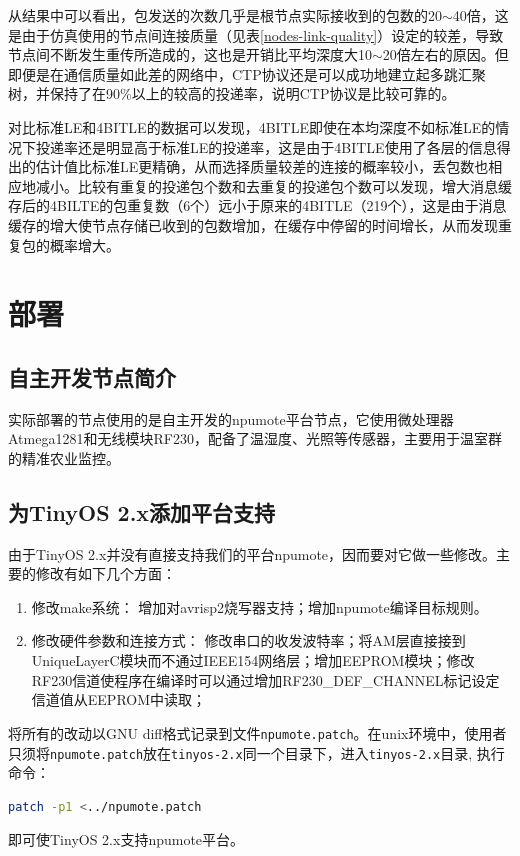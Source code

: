 从结果中可以看出，包发送的次数几乎是根节点实际接收到的包数的20$\sim$40倍，这是由于仿真使用的节点间连接质量（见表\ref{nodes-link-quality}）设定的较差，导致节点间不断发生重传所造成的，这也是开销比平均深度大10$\sim$20倍左右的原因。但即便是在通信质量如此差的网络中，CTP协议还是可以成功地建立起多跳汇聚树，并保持了在90\%以上的较高的投递率，说明CTP协议是比较可靠的。

对比标准LE和4BITLE的数据可以发现，4BITLE即使在本均深度不如标准LE的情况下投递率还是明显高于标准LE的投递率，这是由于4BITLE使用了各层的信息得出的估计值比标准LE更精确，从而选择质量较差的连接的概率较小，丢包数也相应地减小。比较有重复的投递包个数和去重复的投递包个数可以发现，增大消息缓存后的4BILTE的包重复数（6个）远小于原来的4BITLE（219个），这是由于消息缓存的增大使节点存储已收到的包数增加，在缓存中停留的时间增长，从而发现重复包的概率增大。

\section{部署}
\subsection{自主开发节点简介}
实际部署的节点使用的是自主开发的npumote平台节点，它使用微处理器Atmega1281和无线模块RF230，配备了温湿度、光照等传感器，主要用于温室群的精准农业监控。

\subsection{为TinyOS 2.x添加平台支持}
由于TinyOS 2.x并没有直接支持我们的平台npumote，因而要对它做一些修改。主要的修改有如下几个方面：
\vspace{-10pt}
\begin{enumerate}
	\item{修改make系统：} 增加对avrisp2烧写器支持；增加npumote编译目标规则。
	\item{修改硬件参数和连接方式：} 修改串口的收发波特率；将AM层直接接到UniqueLayerC模块而不通过IEEE154网络层；增加EEPROM模块；修改RF230信道使程序在编译时可以通过增加RF230\_DEF\_CHANNEL标记设定信道值从EEPROM中读取；
\end{enumerate}
\vspace{-10pt}
将所有的改动以GNU diff格式记录到文件\texttt{npumote.patch}。在unix环境中，使用者只须将\texttt{npumote.patch}放在\texttt{tinyos-2.x}同一个目录下，进入\texttt{tinyos-2.x}目录, 执行命令：
\begin{lstlisting}[language=bash,numbers=none]
    patch -p1 <../npumote.patch
\end{lstlisting}
即可使TinyOS 2.x支持npumote平台。

